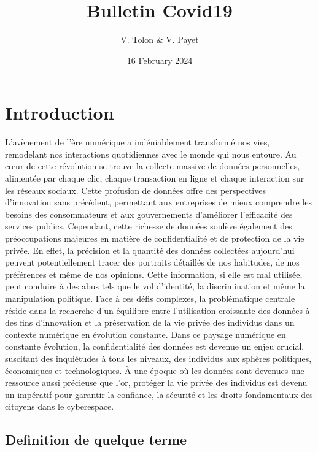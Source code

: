 \documentclass[
]{article}
\title{Bulletin Covid19}
\author{V. Tolon \& V. Payet}
\date{16 February 2024}
\begin{document}
\maketitle

{
\setcounter{tocdepth}{3}
\tableofcontents
}
\hypertarget{introduction}{%
\section{Introduction}\label{introduction}}

L'avènement de l'ère numérique a indéniablement transformé nos vies,
remodelant nos interactions quotidiennes avec le monde qui nous entoure.
Au cœur de cette révolution se trouve la collecte massive de données
personnelles, alimentée par chaque clic, chaque transaction en ligne et
chaque interaction sur les réseaux sociaux. Cette profusion de données
offre des perspectives d'innovation sans précédent, permettant aux
entreprises de mieux comprendre les besoins des consommateurs et aux
gouvernements d'améliorer l'efficacité des services publics. Cependant,
cette richesse de données soulève également des préoccupations majeures
en matière de confidentialité et de protection de la vie privée. En
effet, la précision et la quantité des données collectées aujourd'hui
peuvent potentiellement tracer des portraits détaillés de nos habitudes,
de nos préférences et même de nos opinions. Cette information, si elle
est mal utilisée, peut conduire à des abus tels que le vol d'identité,
la discrimination et même la manipulation politique. Face à ces défis
complexes, la problématique centrale réside dans la recherche d'un
équilibre entre l'utilisation croissante des données à des fins
d'innovation et la préservation de la vie privée des individus dans un
contexte numérique en évolution constante. Dans ce paysage numérique en
constante évolution, la confidentialité des données est devenue un enjeu
crucial, suscitant des inquiétudes à tous les niveaux, des individus aux
sphères politiques, économiques et technologiques. À une époque où les
données sont devenues une ressource aussi précieuse que l'or, protéger
la vie privée des individus est devenu un impératif pour garantir la
confiance, la sécurité et les droits fondamentaux des citoyens dans le
cyberespace.

\hypertarget{definition-de-quelque-terme}{%
\subsection{Definition de quelque
terme}\label{definition-de-quelque-terme}}
\end{document}
